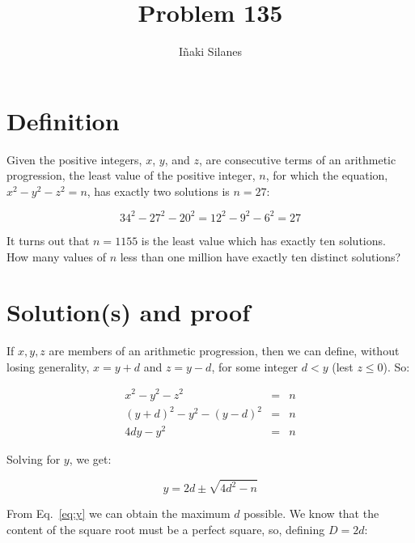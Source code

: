 \documentclass[english]{article}
\begin{document}
\newcommand{\mc}{\multicolumn}
\newcommand{\mr}{\multirow}
\newcommand{\cw}{\columnwidth}
\newcommand{\ig}[2]{\texttt{[image: \#2]}}

\title{Problem 135}
\author{I\~naki Silanes}
\maketitle

\section{Definition}

Given the positive integers, $x$, $y$, and $z$, are consecutive terms of an arithmetic progression, the least value of the positive integer, $n$, for which the equation, $x^2 - y^2 - z^2 = n$, has exactly two solutions is $n = 27$:

\begin{equation}
34^2 - 27^2 - 20^2 = 12^2 - 9^2 - 6^2 = 27
\end{equation}

It turns out that $n = 1155$ is the least value which has exactly ten solutions.\\

How many values of $n$ less than one million have exactly ten distinct solutions?

\section{Solution(s) and proof}

If ${x,y,z}$ are members of an arithmetic progression, then we can define, without losing generality, $x = y + d$ and $z = y - d$, for some integer $d < y$ (lest $z \leq 0$). So:

\begin{eqnarray}
x^2 - y^2 - z^2 & = & n \\
(y+d)^2 - y^2 - (y-d)^2 & = & n \\
4 d y - y^2 & = & n \label{eq:n}
\end{eqnarray}

Solving for $y$, we get:

\begin{equation}
y = 2d \pm \sqrt{4d^2-n} \label{eq:y}
\end{equation}

From Eq.~\ref{eq:y} we can obtain the maximum $d$ possible. We know that the content of the square root must be a perfect square, so, defining $D = 2d$:
\end{document}
